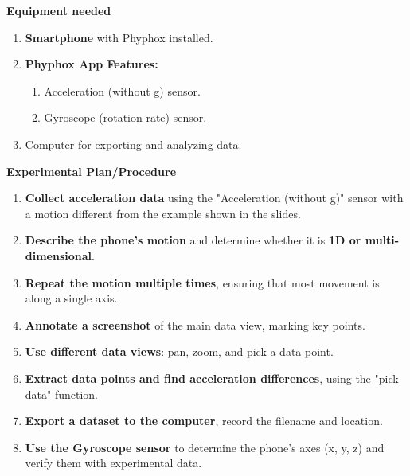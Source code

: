 \documentclass[idxtotoc,hyperref,openany]{labbook} %
\begin{document}
\hfill \break
\textbf{Equipment needed}
\begin{enumerate}[$\bullet$]
    \item \textbf{Smartphone} with Phyphox installed.
    \item \textbf{Phyphox App Features:}
    \begin{enumerate}[$\bullet$]
        \item Acceleration (without g) sensor.
        \item Gyroscope (rotation rate) sensor.
    \end{enumerate}
    \item Computer for exporting and analyzing data.
\end{enumerate}

\hfill \break
\textbf{Experimental Plan/Procedure}
\begin{enumerate}
    \item \textbf{Collect acceleration data} using the "Acceleration (without g)" sensor with a motion different from the example shown in the slides.
    \item \textbf{Describe the phone’s motion} and determine whether it is \textbf{1D or multi-dimensional}.
    \item \textbf{Repeat the motion multiple times}, ensuring that most movement is along a single axis.
    \item \textbf{Annotate a screenshot} of the main data view, marking key points.
    \item \textbf{Use different data views}: pan, zoom, and pick a data point.
    \item \textbf{Extract data points and find acceleration differences}, using the "pick data" function.
    \item \textbf{Export a dataset to the computer}, record the filename and location.
    \item \textbf{Use the Gyroscope sensor} to determine the phone’s axes (x, y, z) and verify them with experimental data.
\end{enumerate}


\end{document}
